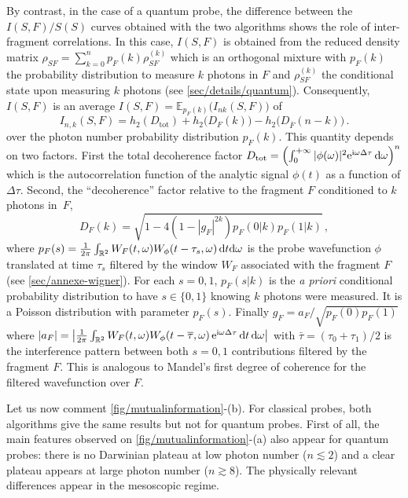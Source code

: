 By contrast, in the case of a quantum probe, the difference between the
$I(S,F)/S(S)$ curves obtained with the two algorithms shows the role 
of inter-fragment correlations. In this case, $I(S,F)$ is obtained 
from the reduced density matrix 
$\rho_{SF} =\sum_{k=0}^n p_F(k) \rho_{SF}^{(k)}$
which is an orthogonal mixture with $p_F(k)$ the probability distribution
 to measure $k$ photons in $F$ and $\rho_{SF}^{(k)}$ the conditional 
state upon measuring $k$ photons (see \cref{sec/details/quantum}). 
Consequently, $I(S,F)$ is an average 
$I(S,F) = \mathbb{E}_{p_F(k)}\big( I_{nk}(S,F) \big)$ of
%
\begin{equation}
I_{n,k}(S,F) =  
	h_2(D_{\text{tot}})
	+ h_2\big( D_{F}(k)\big) 
	- h_2\big(D_{\overline{F}}(n-k)\big)
\,.
\label{eq/Focknk}
\end{equation}
over the photon number probability distribution $p_F(k)$. This quantity
depends on two factors. First the total decoherence 
factor 
$
D_{\text{tot}} = 
	\left(
	\int_0^{+\infty} 
		|\phi(\omega)|^2 \mathrm{e}^{\mathrm{i}\omega\Delta\tau}
	\,\mathrm{d}\omega
	\right)^n
$
which is the autocorrelation function of the analytic
signal $\phi(t)$ as a function of $\Delta\tau$. Second, the 
``decoherence'' factor relative to the fragment $F$ conditioned to $k$
photons in~$F$, 
%
\begin{equation}
	D_F(k)
	= \sqrt{1-4(1-|g_F|^{2k})p_F(0|k)p_F(1|k)}\,,
\end{equation}
where
$p_F(s) = \frac{1}{2\pi}\int_{\mathbb{R}^2} W_F(t,\omega)W_{\phi}(t-\tau_s,\omega)
\, \mathrm{d} t\mathrm{d}\omega$ is the probe wavefunction $\phi$
translated at time $\tau_s$ filtered by the window $W_F$ associated with
the fragment $F$ (see \cref{sec/annexe-wigner}). For each $s=0,1$, $p_F(s|k)$ is the
\emph{a priori} conditional probability distribution to have $s\in\lbrace 0,1\rbrace$
knowing $k$ photons were measured. It is
a Poisson distribution with
parameter $p_F(s)$. Finally $g_F = a_F/\sqrt{p_F(0)p_F(1)}$
where
$|a_F|=\left| \frac{1}{2\pi}\int_{\mathbb{R}^2} 
	W_F(t,\omega)W_{\phi}(t-\overline{\tau},\omega) \,\mathrm{e}^{\mathrm{i}\omega\Delta\tau}
\, \mathrm{d} t\,\mathrm{d}\omega\right|
$ with $\bar{\tau}=(\tau_0+\tau_1)/2$
is the interference pattern between both $s=0,1$ contributions
filtered by the fragment $F$. This is analogous to Mandel's first degree
of coherence for the filtered wavefunction over $F$.

Let us now comment \cref{fig/mutualinformation}-(b). For classical 
probes, both algorithms give the same results but not for quantum 
probes. First of all, the main features 
observed on \cref{fig/mutualinformation}-(a) also appear
for quantum probes: there is no Darwinian plateau at low photon number
($n\lesssim 2$) and a clear plateau appears at large photon number 
($n\gtrsim 8$). 
The physically relevant differences appear in the mesoscopic regime.

